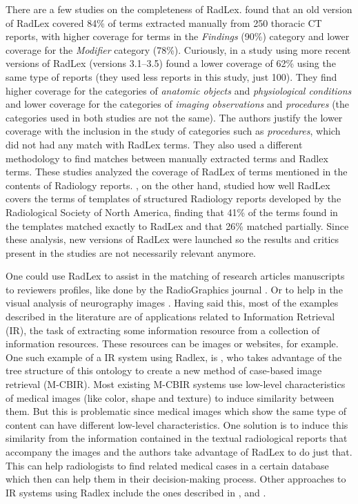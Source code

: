 There are a few studies on the completeness of RadLex. \citep{Marwede2008} found that an old version of RadLex covered 84\% of terms extracted manually from 250 thoracic CT reports, with higher coverage for terms in the \textit{Findings} (90\%) category and lower coverage for the \textit{Modifier} category (78\%). Curiously, in a study using more recent versions of RadLex (versions 3.1–3.5) \citep{Woods2013} found a lower coverage of 62\% using the same type of reports (they used less reports in this study, just 100). They find higher coverage for the categories of \textit{anatomic objects} and \textit{physiological conditions} and lower coverage for the categories of \textit{imaging observations} and \textit{procedures} (the categories used in both studies are not the same). The authors justify the lower coverage with the inclusion in the study of categories such as \textit{procedures}, which did not had any match with RadLex terms. They also used a different methodology to find matches between manually extracted terms and Radlex terms. These studies analyzed the coverage of RadLex of terms mentioned in the contents of Radiology reports. \citep{Hong2012}, on the other hand, studied how well RadLex covers the terms of templates of structured Radiology reports developed by the Radiological Society of North America, finding that 41\% of the terms found in the templates matched exactly to RadLex and that 26\% matched partially. Since these analysis, new versions of RadLex were launched so the results and critics present in the studies are not necessarily relevant anymore.

One could use RadLex to assist in the matching of research articles manuscripts to reviewers profiles, like done by the RadioGraphics journal \citep{Klein2013}. Or to help in the visual analysis of neurography images \citep{Wang2015}. Having said this, most of the examples described in the literature are of applications related to Information Retrieval (IR), the task of extracting some information resource from a collection of information resources. These resources can be images or websites, for example. One such example of a IR system using Radlex, is \citep{Spanier2016}, who takes advantage of the tree structure of this ontology to create a new method of case-based image retrieval (M-CBIR). Most existing M-CBIR systems use low-level characteristics of medical images (like color, shape and texture) to induce similarity between them. But this is problematic since medical images which show the same type of content can have different low-level characteristics. One solution is to induce this similarity from the information contained in the textual radiological reports that accompany the images and the authors take advantage of RadLex to do just that. This can help radiologists to find related medical cases in a certain database which then can help them in their decision-making process. Other approaches to IR systems using Radlex include the ones described in \citep{Do2010}, \citep{Kurtz2014} and \citep{Gerstmair2012}.


